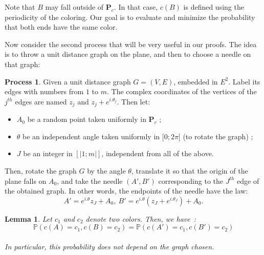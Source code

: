 \documentclass[a4paper,11pt]{article}
\newtheorem{lemma}{Lemma}
\theoremstyle{definition}
\newtheorem{process}{Process}
\theoremstyle{remark}
\renewcommand{\P}{\mathbf{P}}
\begin{document}
Note that $B$ may fall outside of $\P_c$. In that case, $c(B)$ is 
defined using the periodicity of the coloring.
Our goal is to evaluate and minimize the probability that both ends have the 
same color.

Now consider the second process that will be very useful in our 
proofs. The idea is to throw a unit distance graph on the 
plane, and then to choose a needle on that graph:
\begin{process}
Given a unit distance graph $G = (V,E)$, embedded in $E^2$. Label its edges with numbers from 
$1$ to $m$. The complex coordinates of the vertices of the $j^{th}$ edges are 
named $z_j $ and $z_j + e^{i.\theta_j}$. Then let: 
\begin{itemize}
\item $A_0$ be a random point taken uniformly in $\P_c$ ;
\item $\theta$ be an independent angle taken uniformly in $[0;2\pi[$ (to rotate the graph) ;
\item $J$ be an integer in $[| 1;m|]$, independent from all of the above.
\end{itemize}
Then, rotate the graph $G$ by the angle $\theta$, translate it so that the origin 
of the plane falls on $A_0$, and take the needle $(A',B')$ corresponding to the $J^{th}$ 
edge of the obtained graph. In other words, the endpoints of the needle have the law:
$$A' = e^{i.\theta} z_J + A_0, \ B' = e^{i.\theta} (z_J + e^{i.\theta_J}) + A_0.$$
\end{process}

\begin{lemma}\label{huitre}
Let $c_1$ and $c_2$ denote 
two colors. Then, we 
have~:\\
 $$\mathbb{P}(c(A) = c_1, c(B) = c_2) = \mathbb{P}(c(A') = c_1, c(B') = c_2) $$ \\
 In particular, this probability does not depend on the graph 
 chosen.
\end{lemma}
\end{document}
